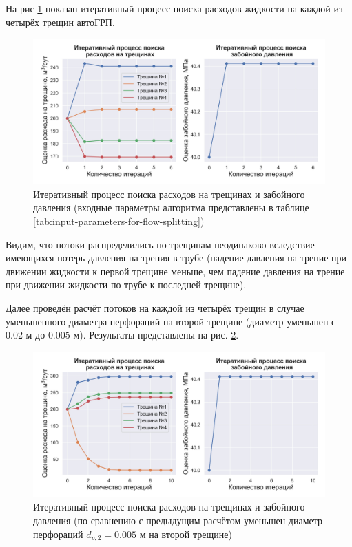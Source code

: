 На рис \ref{fig:flows_distribution_between_fractures_1} показан итеративный процесс поиска расходов жидкости на каждой из четырёх трещин автоГРП.

\begin{figure}[H] 
\center
\includegraphics[width=\linewidth]{images/flows_distribution_between_fractures_1.jpg}
\caption{Итеративный процесс поиска расходов на трещинах и забойного давления (входные параметры алгоритма представлены в таблице \ref{tab:input-parameters-for-flow-splitting})}
\label{fig:flows_distribution_between_fractures_1}  
\end{figure}

Видим, что потоки распределились по трещинам неодинаково вследствие имеющихся потерь давления на трения в трубе (падение давления на трение при движении жидкости к первой трещине меньше, чем падение давления на трение при движении жидкости по трубе к последней трещине).

Далее проведён расчёт потоков на каждой из четырёх трещин в случае уменьшенного диаметра перфораций на второй трещине (диаметр уменьшен с $0.02$ м до $0.005$ м).
Результаты представлены на рис. \ref{fig:flows_distribution_between_fractures_2}.

\begin{figure}[H] 
\center
\includegraphics[width=\linewidth]{images/flows_distribution_between_fractures_2.jpg}
\caption{Итеративный процесс поиска расходов на трещинах и забойного давления (по сравнению с предыдущим расчётом уменьшен диаметр перфораций $d_{p,2}=0.005$ м на второй трещине)}
\label{fig:flows_distribution_between_fractures_2}  
\end{figure}

